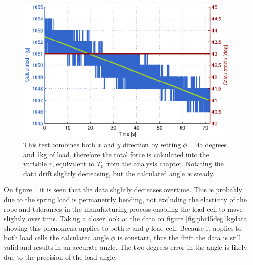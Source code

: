 \begin{figure}[hbtp]
\centering
\includegraphics[scale=0.8]{graphics/gcs_test/phi45deg1kg.eps}
\caption[Test of calculating the horizontal angle]{This test combines both $x$ and $y$ direction by setting $\phi=45$ degrees and 1kg of load, therefore the total force is calculated into the variable $r$, equivalent to $T_0$ from the analysis chapter. Notating the data drift slightly decreasing, but the calculated angle is steady. }
\label{fig:phi45deg1kg}
\end{figure}

\newpage
\noindent
On figure \ref{fig:phi45deg1kg} it is seen that the data slightly decreases overtime. This is probably due to the spring load is permanently bending, not excluding the elasticity of the rope and tolerances in the manufacturing process enabling the load cell to move slightly over time. Taking a closer look at the data on figure \ref{fig:phi45deg1kgdata} showing this phenomena applies to both $x$ and $y$ load cell. Because it applies to both load cells the calculated angle $\phi$ is constant, thus the drift the data is still valid and results in an accurate angle. The two degrees error in the angle is likely due to the precision of the load angle.

